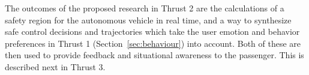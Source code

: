    
   
   
The outcomes of the proposed research in Thrust 2 are the calculations of a safety region for the autonomous vehicle in real time, and a way to synthesize safe control decisions and trajectories which take the user emotion and behavior preferences in Thrust 1 (Section~\ref{sec:behaviour}) into account. Both of these are then used to provide feedback and situational awareness to the passenger. This is described next in Thrust 3.   
   